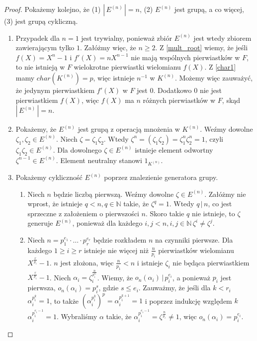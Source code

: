 \documentclass[polish,declaration,shortabstract]{iithesis}
\theoremstyle{definition}
\theoremstyle{remark} \newtheorem{observation}{Obserwacja}
\theoremstyle{plain} \newtheorem{theorem}{Twierdzenie}
\theoremstyle{plain} \newtheorem{lemma}{Lemat}
\theoremstyle{remark} \newtheorem*{remark*}{Uwaga}
\theoremstyle{reminder} \newtheorem*{reminder*}{Przypomnienie}
\begin{document}
\begin{proof}
	Pokażemy kolejno, że (1) $|\,E^{(n)}\,| = n$, (2) $E^{(n)}$ jest grupą, a co więcej, (3) jest grupą cykliczną.
	\begin{enumerate}[label=(\arabic*),leftmargin=.4in]
		\item Przypadek dla $n = 1$ jest trywialny, ponieważ zbiór $E^{(n)}$ jest wtedy zbiorem zawierającym tylko $1$. Załóżmy więc, że $n \geq 2$. Z \ref{mult_root} wiemy, że jeśli $f(X) = X^n - 1$ i $f'(X) = nX^{n-1}$ nie mają wspólnych pierwiastków w $F$, to nie istnieją w $F$ wielokrotne pierwiastki wielomianu $f(X)$. Z \ref{char1} mamy $char(K^{(n)}) = p$, więc istnieje $n^{-1}$ w $K^{(n)}$. Możemy więc zauważyć, że jedynym pierwiastkiem $f'(X)$ w $F$ jest $0$. Dodatkowo $0$ nie jest pierwiastkiem $f(X)$, więc $f(X)$ ma $n$ różnych pierwiastków w $F$, skąd $|\,E^{(n)}\,| = n$.
		\item Pokażemy, że $E^{(n)}$ jest grupą z operacją mnożenia w $K^{(n)}$. Weźmy dowolne $\zeta_1, \zeta_2 \in E^{(n)}$. Niech $\zeta = \zeta_1 \zeta_2$. Wtedy $\zeta^n = (\zeta_1 \zeta_2) = \zeta_1^n \zeta_2^n = 1$, czyli $\zeta_1 \zeta_2 \in E^{(n)}$. Dla dowolnego $\zeta \in E^{(n)}$ istnieje element odwortny $\zeta^{n-1} \in E^{(n)}$. Element neutralny stanowi $1_{K^{(n)}}$.
		\item Pokażemy cykliczność $E^{(n)}$ poprzez znalezienie generatora grupy. 
		      \begin{enumerate}[label=(3.\arabic*)]
		      	\item Niech $n$ będzie liczbą pierwszą. Weźmy dowolne $\zeta \in E^{(n)}$. Załóżmy nie wprost, że istnieje $q < n, q \in \mathbb{N}$ takie, że $\zeta^q = 1$. Wtedy $q \, | \, n$, co jest sprzeczne z założeniem o pierwszości $n$. Skoro takie $q$ nie istnieje, to $\zeta$ generuje $E^{(n)}$, ponieważ dla każdego $i, j < n, i, j \in \mathbb{N} \, \zeta^i \neq \zeta^j$.
		      	\item Niech $n = p_1^{e_1} \cdot \dots \cdot p_r^{e_r}$ będzie rozkładem $n$ na czynniki pierwsze. Dla każdego $1 \geq i \geq r$ istnieje nie więcej niż $\frac{n}{p_i}$ pierwiastków wielomianu $X^{\frac{r}{p_i}}-1$. $n$ jest złożona, więc $\frac{n}{p_1} < n$ i istnieje $\zeta_i$ nie będąca pierwiastkiem $X^{\frac{r}{p_i}} - 1$. Niech $\alpha_i = \zeta_i^{\frac{n}{p_i^{e_i}}}$. Wiemy, że $o_n(\alpha_i) \, | \, p_i^{e_i}$, a ponieważ $p_i$ jest pierwsza, $o_n(\alpha_i) = p_i^s$, gdzie $s \leq e_i$. Zauważmy, że jeśli dla $k < r_i$ $\alpha_i^{p_i^k} = 1$, to także $(\alpha_i^{p_i^k})^p = \alpha_i^{p_i^{k+1}} = 1$ i poprzez indukcję względem $k$ $\alpha_i^{p_i^{e_i-1}} = 1$. Wybraliśmy $\alpha$ takie, że $\alpha_i^{p_i^{e_i-1}} = \zeta^{\frac{n}{p_i}} \neq 1$, więc $o_n(\alpha_i) = p_i^{e_i}$. \newline

\end{enumerate}
\end{enumerate}
\end{proof}
\end{document}
